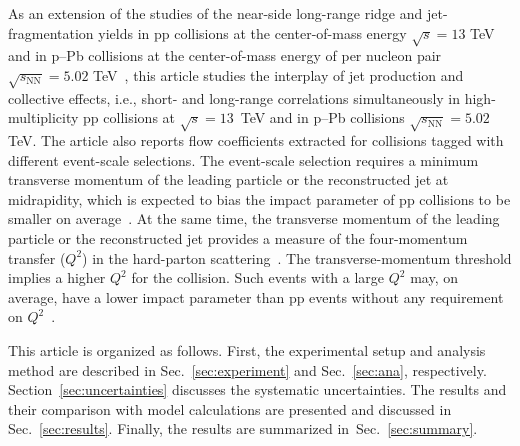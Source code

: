 As an extension of the studies of the near-side long-range ridge and jet-fragmentation yields in pp collisions at the center-of-mass energy $\sqrt{s}=13$ TeV~\cite{ALICE:2021nir} and in p--Pb collisions at the center-of-mass energy of per nucleon pair $\sqrt{s_{\mathrm{NN}}}=5.02$ TeV~\cite{ALICE:2012eyl,ALICE:2013snk}, this article studies the interplay of jet production and collective effects, i.e., short- and long-range correlations simultaneously in high-multiplicity pp collisions at $\sqrt{s} =13$~TeV and in p--Pb collisions $\sqrt{s_{\mathrm{NN}}}=5.02$ TeV. The article also reports flow coefficients extracted for collisions tagged with different event-scale selections. The event-scale selection requires a minimum transverse momentum of the leading particle or the reconstructed jet at midrapidity, which is expected to bias the impact parameter of pp collisions to be smaller on average~\cite{Sjostrand:1986ep,Frankfurt:2003td,Frankfurt:2010ea}. At the same time, the transverse momentum of the leading particle or the reconstructed jet provides a measure of the four-momentum transfer ($Q^2$) in the hard-parton scattering~\cite{Chatrchyan:2012tt, Chatrchyan:2011id,ALICE:2022fnb}. The transverse-momentum threshold implies a higher $Q^2$ for the collision. Such events with a large $Q^2$ may, on average, have a lower impact parameter than pp events without any requirement on $Q^2$~\cite{Frankfurt:2003td}.

This article is organized as follows. First, the experimental setup and analysis method are described in Sec.~\ref{sec:experiment} and Sec.~\ref{sec:ana}, respectively. Section~\ref{sec:uncertainties} discusses the systematic uncertainties. The results and their comparison with model calculations are presented and discussed in Sec.~\ref{sec:results}. Finally, the results are summarized in~Sec.~\ref{sec:summary}.

 
